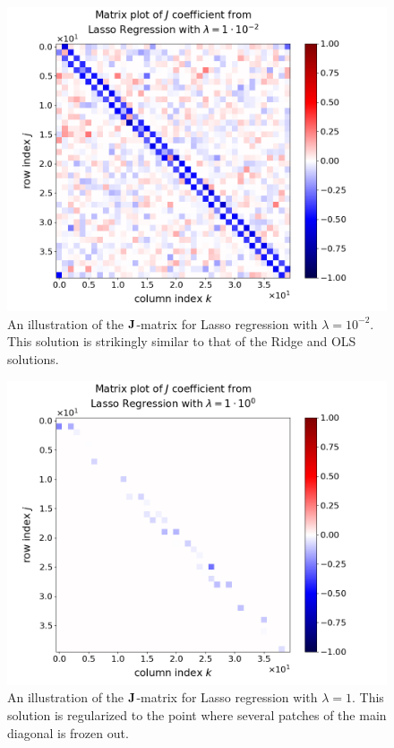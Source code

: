 \documentclass[nofootinbib,reprint,english]{revtex4-1}
\begin{document}
\newpage

\begin{figure}[h!]
\centering
\includegraphics[scale=0.3]{../output/LinReg/Jmatrix_Lasso1.png}
\caption{An illustration of the \(\vb{J}\)-matrix for Lasso regression with \(\lambda=10^{-2}\). This solution is strikingly similar to that of the Ridge and OLS solutions.}\label{fig:LinReg_Jmatrix_Lasso2}
\end{figure}

\begin{figure}[h!]
\centering
\includegraphics[scale=0.3]{../output/LinReg/Jmatrix_Lasso3.png}
\caption{An illustration of the \(\vb{J}\)-matrix for Lasso regression with \(\lambda=1\). This solution is regularized to the point where several patches of the main diagonal is frozen out.}\label{fig:LinReg_Jmatrix_Lasso3}
\end{figure}
\end{document}
